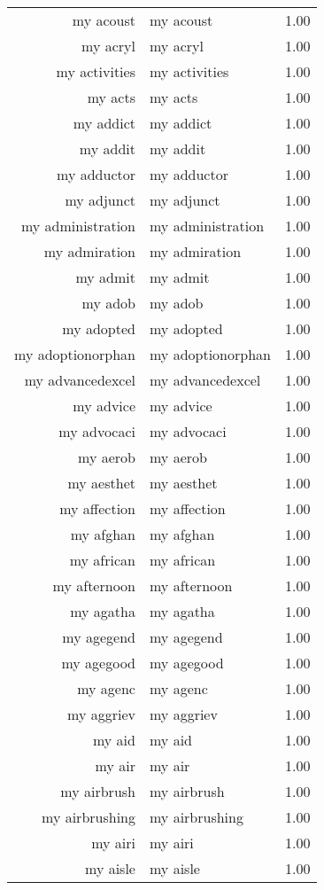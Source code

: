 \begin{table}[ht]
\begin{tabular}{rlr}
  my acoust & my acoust & 1.00 \\ 
  my acryl & my acryl & 1.00 \\ 
  my activities & my activities & 1.00 \\ 
  my acts & my acts & 1.00 \\ 
  my addict & my addict & 1.00 \\ 
  my addit & my addit & 1.00 \\ 
  my adductor & my adductor & 1.00 \\ 
  my adjunct & my adjunct & 1.00 \\ 
  my administration & my administration & 1.00 \\ 
  my admiration & my admiration & 1.00 \\ 
  my admit & my admit & 1.00 \\ 
  my adob & my adob & 1.00 \\ 
  my adopted & my adopted & 1.00 \\ 
  my adoptionorphan & my adoptionorphan & 1.00 \\ 
  my advancedexcel & my advancedexcel & 1.00 \\ 
  my advice & my advice & 1.00 \\ 
  my advocaci & my advocaci & 1.00 \\ 
  my aerob & my aerob & 1.00 \\ 
  my aesthet & my aesthet & 1.00 \\ 
  my affection & my affection & 1.00 \\ 
  my afghan & my afghan & 1.00 \\ 
  my african & my african & 1.00 \\ 
  my afternoon & my afternoon & 1.00 \\ 
  my agatha & my agatha & 1.00 \\ 
  my agegend & my agegend & 1.00 \\ 
  my agegood & my agegood & 1.00 \\ 
  my agenc & my agenc & 1.00 \\ 
  my aggriev & my aggriev & 1.00 \\ 
  my aid & my aid & 1.00 \\ 
  my air & my air & 1.00 \\ 
  my airbrush & my airbrush & 1.00 \\ 
  my airbrushing & my airbrushing & 1.00 \\ 
  my airi & my airi & 1.00 \\ 
  my aisle & my aisle & 1.00 \\ 

\end{tabular}
\end{table}
